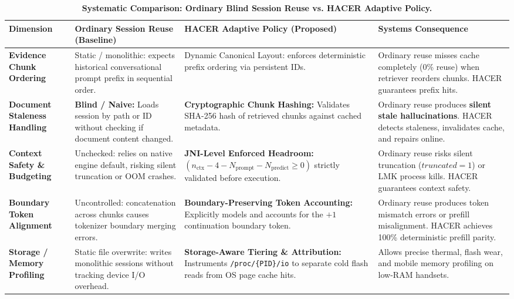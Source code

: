 \begin{table}[t]
\centering
\caption{\textbf{Systematic Comparison: Ordinary Blind Session Reuse vs. HACER Adaptive Policy.}}
\label{tab:baseline_comparison}
\small
\begin{tabular}{p{3.2cm}p{4.2cm}p{4.5cm}p{4.2cm}}
\toprule
\textbf{Dimension} & \textbf{Ordinary Session Reuse (Baseline)} & \textbf{HACER Adaptive Policy (Proposed)} & \textbf{Systems Consequence} \\
\midrule
\textbf{Evidence Chunk Ordering} & Static / monolithic: expects historical conversational prompt prefix in sequential order. & Dynamic Canonical Layout: enforces deterministic prefix ordering via persistent IDs. & Ordinary reuse misses cache completely (0\% reuse) when retriever reorders chunks. HACER guarantees prefix hits. \\
\addlinespace
\textbf{Document Staleness Handling} & \textbf{Blind / Naive:} Loads session by path or ID without checking if document content changed. & \textbf{Cryptographic Chunk Hashing:} Validates SHA-256 hash of retrieved chunks against cached metadata. & Ordinary reuse produces \textbf{silent stale hallucinations}. HACER detects staleness, invalidates cache, and repairs online. \\
\addlinespace
\textbf{Context Safety \& Budgeting} & Unchecked: relies on native engine default, risking silent truncation or OOM crashes. & \textbf{JNI-Level Enforced Headroom:} $(n_{\text{ctx}} - 4 - N_{\text{prompt}} - N_{\text{predict}} \ge 0)$ strictly validated before execution. & Ordinary reuse risks silent truncation ($truncated=1$) or LMK process kills. HACER guarantees context safety. \\
\addlinespace
\textbf{Boundary Token Alignment} & Uncontrolled: concatenation across chunks causes tokenizer boundary merging errors. & \textbf{Boundary-Preserving Token Accounting:} Explicitly models and accounts for the $+1$ continuation boundary token. & Ordinary reuse produces token mismatch errors or prefill misalignment. HACER achieves 100\% deterministic prefill parity. \\
\addlinespace
\textbf{Storage / Memory Profiling} & Static file overwrite: writes monolithic sessions without tracking device I/O overhead. & \textbf{Storage-Aware Tiering \& Attribution:} Instruments \texttt{/proc/\{PID\}/io} to separate cold flash reads from OS page cache hits. & Allows precise thermal, flash wear, and mobile memory profiling on low-RAM handsets. \\
\bottomrule
\end{tabular}
\end{table}
